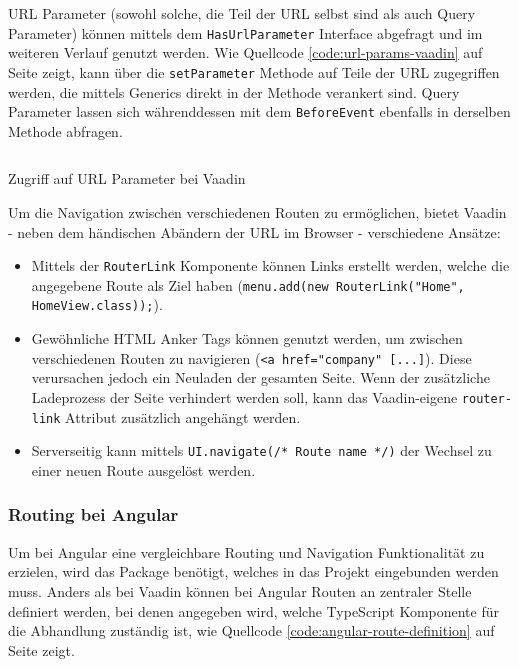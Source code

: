 \documentclass[a4paper,12pt,twoside]{scrreprt}
\begin{document}
\newpage

URL Parameter (sowohl solche, die Teil der URL selbst sind als auch Query Parameter) können mittels dem \texttt{HasUrlParameter} Interface abgefragt und im weiteren Verlauf genutzt werden. Wie Quellcode \ref{code:url-params-vaadin} auf Seite \pageref{code:url-params-vaadin} zeigt, kann über die \texttt{setParameter} Methode auf Teile der URL zugegriffen werden, die mittels Generics direkt in der Methode verankert sind. \parencite[][]{vaadin_ltd_typed_2021} Query Parameter lassen sich währenddessen mit dem \texttt{BeforeEvent} ebenfalls in derselben Methode abfragen. \parencite[][]{vaadin_ltd_query_2021}

\begin{listing}[ht]
    \inputminted[fontsize=\footnotesize,linenos]{java}{code/Luidold_Vaadin-URL-params.java}
    \caption[Zugriff auf URL Parameter bei Vaadin]{Zugriff auf URL Parameter bei Vaadin}
    \label{code:url-params-vaadin}
\end{listing}

\smallskip

Um die Navigation zwischen verschiedenen Routen zu ermöglichen, bietet Vaadin - neben dem händischen Abändern der URL im Browser - verschiedene Ansätze:

\begin{itemize}
    \item Mittels der \texttt{RouterLink} Komponente können Links erstellt werden, welche die angegebene Route als Ziel haben (\texttt{menu.add(new RouterLink("Home", HomeView.class));}). \parencite[][Using the RouterLink Component]{vaadin_ltd_navigating_2021}
    \item Gewöhnliche HTML Anker Tags können genutzt werden, um zwischen verschiedenen Routen zu navigieren (\texttt{<a href="company" [...]}). Diese verursachen jedoch ein Neuladen der gesamten Seite. Wenn der zusätzliche Ladeprozess der Seite verhindert werden soll, kann das Vaadin-eigene \texttt{router-link} Attribut zusätzlich angehängt werden. \parencite[][Using Standard href Links]{vaadin_ltd_navigating_2021}
    \item Serverseitig kann mittels \texttt{UI.navigate(/* Route name */)} der Wechsel zu einer neuen Route ausgelöst werden. \parencite[][Server-side Navigation]{vaadin_ltd_navigating_2021}
\end{itemize}

\subsubsection{Routing bei Angular}
\label{sub-sub-sec:routing-herangehensweise-angular}
Um bei Angular eine vergleichbare Routing und Navigation Funktionalität zu erzielen, wird das  Package benötigt, welches in das Projekt eingebunden werden muss. Anders als bei Vaadin können bei Angular Routen an zentraler Stelle definiert werden, bei denen angegeben wird, welche TypeScript Komponente für die Abhandlung zuständig ist, wie Quellcode \ref{code:angular-route-definition} auf Seite \pageref{code:angular-route-definition} zeigt. \parencite[][]{google_llc_angular_nodate}
\end{document}
